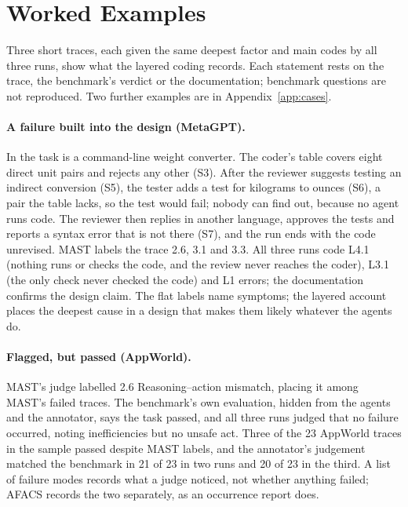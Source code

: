 \documentclass[11pt]{article}
\begin{document}
\section{Worked Examples}
\label{sec:cases}
\sloppy

Three short traces, each given the same deepest factor and main codes by all three
runs, show what the layered
coding records. Each statement rests on the trace, the benchmark's verdict or the
documentation; benchmark questions are not reproduced. Two further examples are in
Appendix~\ref{app:cases}.

\paragraph{A failure built into the design (MetaGPT).} In
 the task is a command-line weight
converter. The coder's table covers eight direct unit pairs and rejects any other
(S3). After the reviewer suggests testing an indirect conversion (S5), the tester
adds a test for kilograms to ounces (S6), a pair the table lacks, so the test
would fail; nobody can find out, because no agent runs code. The reviewer then
replies in another language, approves the tests and reports a syntax error that is
not there (S7), and the run ends with the code unrevised. MAST labels the trace
2.6, 3.1 and 3.3. All three runs code L4.1 (nothing runs or checks the code, and
the review never reaches the coder), L3.1 (the only check never checked the code)
and L1 errors; the documentation confirms the design claim. The flat labels name
symptoms; the layered account places the deepest cause in a design that makes them
likely whatever the agents do.

\paragraph{Flagged, but passed (AppWorld).} MAST's judge labelled
 2.6 Reasoning--action mismatch, placing it
among MAST's failed traces. The benchmark's own evaluation, hidden from the agents
and the annotator, says the task passed, and all three runs judged that no failure
occurred, noting inefficiencies but no unsafe act. Three of the 23 AppWorld traces
in the sample passed despite MAST labels, and the annotator's judgement matched the
benchmark in 21 of 23 in two runs and 20 of 23 in the third. A list of failure modes records what a judge noticed, not
whether anything failed; AFACS records the two separately, as an occurrence report
does.
\end{document}
